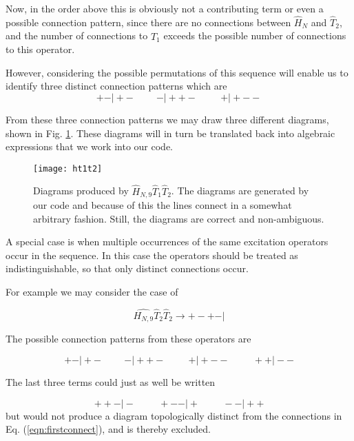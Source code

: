 Now, in the order above this is obviously not a contributing term or
even a possible connection pattern, since there are no connections
between $\hat{H}_N$ and $\hat{T}_2$, and the number of connections to
$\hat{T}_1$ exceeds the possible number of connections to this
operator.

However, considering the possible permutations of this sequence will
enable us to identify three distinct connection patterns which are
\begin{equation}
  + -\vert  + - \hspace{1cm}  -\vert  + + -  \hspace{1cm}  + \vert  + - -
\end{equation}

From these three connection patterns we may draw three different
diagrams, shown in Fig. \ref{fig:ht1t2}. These diagrams will in turn be
translated back into algebraic expressions that we work into our code.
\begin{figure}
 \centering
  \texttt{[image: ht1t2]}
  \caption{Diagrams produced by $\hat{H}_{N,9} \hat{T}_1 \hat{T}_2
    $. The diagrams are generated by our code and because of this the
    lines connect in a somewhat arbitrary fashion. Still, the diagrams
    are correct and non-ambiguous.}
\label{fig:ht1t2}
\end{figure}

A special case is when multiple occurrences of the same excitation
operators occur in the sequence. In this case the operators should be
treated as indistinguishable, so that only distinct connections occur.

For example we may consider the case of 

\begin{equation}
\hat{H_{N,9}} \hat{T}_2 \hat{T}_2 \rightarrow  + - + - \vert 
\end{equation}

The possible connection patterns from these operators are

\begin{equation}
  + -\vert  + - \hspace{1cm}  -\vert  + + -  \hspace{1cm}  + \vert  + - - \hspace{1cm}  ++ \vert  - -
\label{eqn:firstconnect}
\end{equation}

The last three terms could just as well be written

\begin{equation}
 + + -\vert  -  \hspace{1cm}  + - - \vert  + \hspace{1cm} - - \vert  + +
\end{equation}
but would not produce a diagram topologically distinct from the
connections in Eq. (\ref{eqn:firstconnect}), and is thereby excluded.


